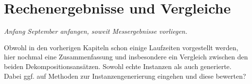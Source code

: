 \documentclass{scrreprt}
\begin{document}
\chapter{Rechenergebnisse und Vergleiche}
\textit{Anfang September anfangen, soweit Messergebnisse vorliegen.}

Obwohl in den vorherigen Kapiteln schon einige Laufzeiten vorgestellt werden, hier nochmal eine Zusammenfassung und insbesondere ein Vergleich
zwischen den beiden Dekompositionsansätzen. Sowohl echte Instanzen als auch generierte. 
Dabei ggf. auf Methoden zur Instanzengenerierung eingehen und diese bewerten?



\newpage


\end{document}
